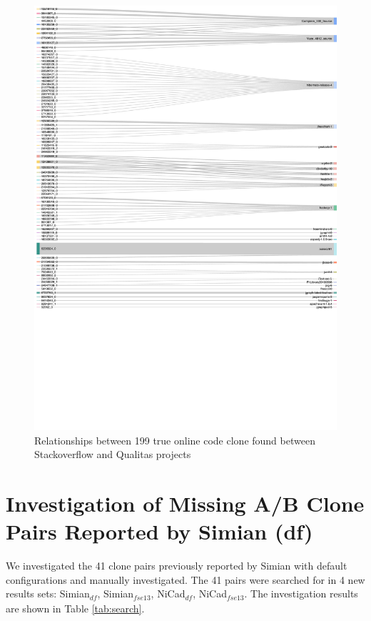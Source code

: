 \documentclass{IEEEtran}
\begin{document}
\begin{figure}[H]
	\centering
	\includegraphics[width=1\linewidth]{Sankey_proj}
	\caption{Relationships between 199 true online code clone found between Stackoverflow and Qualitas projects}
	\label{fig:sankey}
\end{figure}


\newpage

\section*{Investigation of Missing A/B Clone Pairs Reported by Simian (df)}
We investigated the 41 clone pairs previously reported by Simian with default configurations and manually investigated. The 41 pairs were searched for in 4 new results sets: Simian$_{\mathrm{\textit{df}}}$, Simian$_{\mathrm{\textit{fse13}}}$, NiCad$_{\mathrm{\textit{df}}}$, NiCad$_{\mathrm{\textit{fse13}}}$. The investigation results are shown in Table \ref{tab:search}.
\end{document}
